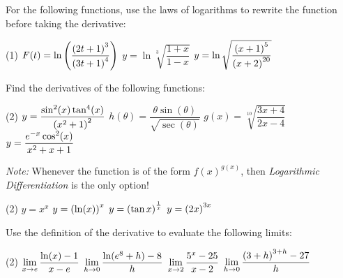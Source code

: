 \documentclass[mathNotesPreamble]{subfiles}
\begin{document}
  \begin{ex*}
    For the following functions, use the laws of logarithms to rewrite the function before taking the derivative:
  \end{ex*}
  
  \noindent
  \begin{tasks}[after-item-skip=\stretch{1}, label=~](1)
    \task $F(t)=\ln\parens{\dfrac{\parens{2t+1}^3}{\parens{3t+1}^4}}$
    \task $y=\ln\sqrt[3]{\dfrac{1+x}{1-x}}$
    \task $y=\ln\sqrt{\dfrac{\parens{x+1}^5}{\parens{x+2}^{20}}}$
  \end{tasks}
  \vfill 
  
  \pagebreak
  \noindent
  \begin{ex*}
    Find the derivatives of the following functions:
  \end{ex*}
  \begin{tasks}[after-item-skip=\stretch{1}, label=~](2)
    \task $y=\dfrac{\sin^2(x)\tan^4(x)}{\parens{x^2+1}^2}$
    \task $h(\theta)=\dfrac{\theta \sin(\theta)}{\sqrt{\sec(\theta)}}$
    \task $g(x)=\sqrt[10]{\dfrac{3x+4}{2x-4}}$
    \task $y=\dfrac{e\inv[x]\cos^2(x)}{x^2+x+1}$
  \end{tasks}
  \vfill
  \pagebreak
  
  \noindent
  \textit{Note:} Whenever the function is of the form $f(x)^{g(x)}$, then \textit{Logarithmic Differentiation} is the only option!
  \begin{tasks}[after-item-skip=\stretch{1}, label=~](2)
    \task $y=x^x$
    \task $y=\parens{\ln(x)}^x$
    \task $y=\parens{\tan x}^\frac{1}{x}$
    \task $y=\parens{2x}^{3x}$
  \end{tasks}
  \vfill 
  \pagebreak
  
  \begin{ex*}
    Use the definition of the derivative to evaluate the following limits:
  \end{ex*}
  \begin{tasks}[after-item-skip=\stretch{1}, label=~](2)
    \task $\ds\lim_{x\to e} \dfrac{\ln(x)-1}{x-e}$
    \task $\ds\lim_{h\to 0} \dfrac{\ln(e^8+h)-8}{h}$
    \task $\ds\lim_{x\to 2} \dfrac{5^x-25}{x-2}$
    \task $\ds\lim_{h\to 0} \dfrac{\parens{3+h}^{3+h}-27}{h}$
  \end{tasks}
  \vfill
  \pagebreak
  
\end{document}
